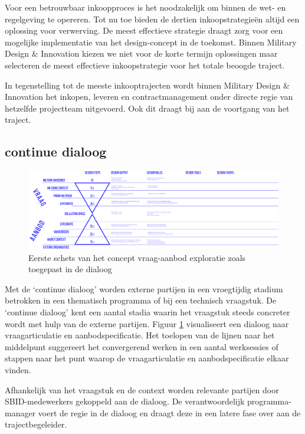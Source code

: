 \documentclass[
]{book}
\begin{document}
Voor een betrouwbaar inkoopproces is het noodzakelijk om binnen de wet- en regelgeving te opereren. Tot nu toe bieden de dertien inkoopstrategieën altijd een oplossing voor verwerving. De meest effectieve strategie draagt zorg voor een mogelijke implementatie van het design-concept in de toekomst. Binnen Military Design \& Innovation kiezen we niet voor de korte termijn oplossingen maar selecteren de meest effectieve inkoopstrategie voor het totale beoogde traject.

In tegenstelling tot de meeste inkooptrajecten wordt binnen Military Design \& Innovation het inkopen, leveren en contractmanagement onder directe regie van hetzelfde projectteam uitgevoerd. Ook dit draagt bij aan de voortgang van het traject.

\hypertarget{continue-dialoog}{%
\subsection{continue dialoog}\label{continue-dialoog}}

\begin{figure}

{\centering \includegraphics[width=0.6\linewidth]{data/images/20200426-CDE-designproces_vraag-aanbod-exploratie_blauwdruk-v2} 

}

\caption{Eerste schets van het concept vraag-aanbod exploratie zoals toegepast in de dialoog }\label{fig:vraag-aanbod}
\end{figure}

Met de `continue dialoog' worden externe partijen in een vroegtijdig stadium betrokken in een thematisch programma of bij een technisch vraagstuk. De `continue dialoog' kent een aantal stadia waarin het vraagstuk steeds concreter wordt met hulp van de externe partijen. Figuur \ref{fig:vraag-aanbod} visualiseert een dialoog naar vraagarticulatie en aanbodspecificatie. Het toelopen van de lijnen naar het middelpunt suggereert het convergerend werken in een aantal werksessies of stappen naar het punt waarop de vraagarticulatie en aanbodspecificatie elkaar vinden.

Afhankelijk van het vraagstuk en de context worden relevante partijen door SBID-medewerkers gekoppeld aan de dialoog. De verantwoordelijk programma-manager voert de regie in de dialoog en draagt deze in een latere fase over aan de trajectbegeleider.
\end{document}
